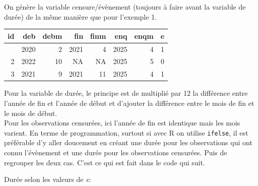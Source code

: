 \documentclass[
  12pt,
  letterpaper,
  DIV=11,
  numbers=noendperiod,
  onepage,
  openany]{scrreprt}
\newenvironment{Shaded}{\begin{snugshade}}{\end{snugshade}}
\newcommand{\DecValTok}[1]{\textcolor[rgb]{0.86,0.86,0.80}{#1}}
\newcommand{\FunctionTok}[1]{\textcolor[rgb]{0.94,0.94,0.56}{#1}}
\newcommand{\NormalTok}[1]{\textcolor[rgb]{0.80,0.80,0.80}{#1}}
\newcommand{\OtherTok}[1]{\textcolor[rgb]{0.94,0.94,0.56}{#1}}
\newcommand{\SpecialCharTok}[1]{\textcolor[rgb]{0.86,0.64,0.64}{#1}}
\begin{document}
On génère la variable censure/évènement (toujours à faire avant la
variable de durée) de la même manière que pour l'exemple 1.

\begin{Shaded}
\end{Shaded}

\begin{longtable}[]{@{}rrrrrrrr@{}}
\toprule\noalign{}
id & deb & debm & fin & finm & enq & enqm & e \\
\midrule\noalign{}
\endhead
\bottomrule\noalign{}
\endlastfoot
1 & 2020 & 2 & 2021 & 4 & 2025 & 4 & 1 \\
2 & 2022 & 10 & NA & NA & 2025 & 5 & 0 \\
3 & 2021 & 9 & 2021 & 11 & 2025 & 4 & 1 \\
\end{longtable}

Pour la variable de durée, le principe est de multiplié par 12 la
différence entre l'année de fin et l'année de début et d'ajouter la
différence entre le mois de fin et le mois de début.\\
Pour les observations censurées, ici l'année de fin est identique mais
les mois varient. En terme de programmation, surtout si avec R on
utilise \texttt{ifelse}, il est préférable d'y aller doucement en créant
une durée pour les observations qui ont connu l'évènement et une durée
pour les observations censurées. Puis de regrouper les deux cas. C'est
ce qui est fait dans le code qui suit.

Durée selon les valeurs de \emph{e}:

\begin{Shaded}
\end{Shaded}
\end{document}
